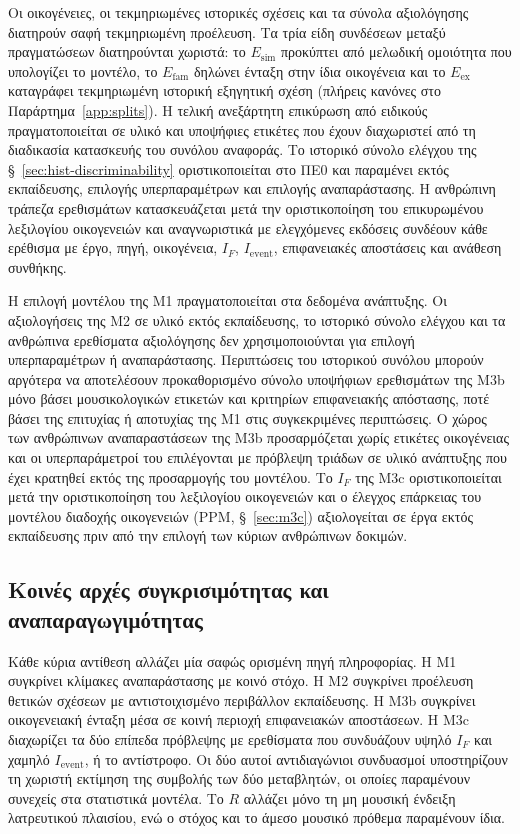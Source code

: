 \documentclass[11pt,a4paper]{article}
\begin{document}
Οι οικογένειες, οι τεκμηριωμένες ιστορικές σχέσεις και τα σύνολα αξιολόγησης διατηρούν σαφή τεκμηριωμένη προέλευση. Τα τρία είδη συνδέσεων μεταξύ πραγματώσεων διατηρούνται χωριστά: το $E_{\mathrm{sim}}$ προκύπτει από μελωδική ομοιότητα που υπολογίζει το μοντέλο, το $E_{\mathrm{fam}}$ δηλώνει ένταξη στην ίδια οικογένεια και το $E_{\mathrm{ex}}$ καταγράφει τεκμηριωμένη ιστορική εξηγητική σχέση (πλήρεις κανόνες στο Παράρτημα~\ref{app:splits}). Η τελική ανεξάρτητη επικύρωση από ειδικούς πραγματοποιείται σε υλικό και υποψήφιες ετικέτες που έχουν διαχωριστεί από τη διαδικασία κατασκευής του συνόλου αναφοράς. Το ιστορικό σύνολο ελέγχου της §~\ref{sec:hist-discriminability} οριστικοποιείται στο ΠΕ0 και παραμένει εκτός εκπαίδευσης, επιλογής υπερπαραμέτρων και επιλογής αναπαράστασης. Η ανθρώπινη τράπεζα ερεθισμάτων κατασκευάζεται μετά την οριστικοποίηση του επικυρωμένου λεξιλογίου οικογενειών και αναγνωριστικά με ελεγχόμενες εκδόσεις συνδέουν κάθε ερέθισμα με έργο, πηγή, οικογένεια, $I_F$, $I_{\mathrm{event}}$, επιφανειακές αποστάσεις και ανάθεση συνθήκης.

Η επιλογή μοντέλου της M1 πραγματοποιείται στα δεδομένα ανάπτυξης. Οι αξιολογήσεις της M2 σε υλικό εκτός εκπαίδευσης, το ιστορικό σύνολο ελέγχου και τα ανθρώπινα ερεθίσματα αξιολόγησης δεν χρησιμοποιούνται για επιλογή υπερπαραμέτρων ή αναπαράστασης. Περιπτώσεις του ιστορικού συνόλου μπορούν αργότερα να αποτελέσουν προκαθορισμένο σύνολο υποψήφιων ερεθισμάτων της M3b μόνο βάσει μουσικολογικών ετικετών και κριτηρίων επιφανειακής απόστασης, ποτέ βάσει της επιτυχίας ή αποτυχίας της M1 στις συγκεκριμένες περιπτώσεις. Ο χώρος των ανθρώπινων αναπαραστάσεων της M3b προσαρμόζεται χωρίς ετικέτες οικογένειας και οι υπερπαράμετροί του επιλέγονται με πρόβλεψη τριάδων σε υλικό ανάπτυξης που έχει κρατηθεί εκτός της προσαρμογής του μοντέλου. Το $I_F$ της M3c οριστικοποιείται μετά την οριστικοποίηση του λεξιλογίου οικογενειών και ο έλεγχος επάρκειας του μοντέλου διαδοχής οικογενειών (PPM, §~\ref{sec:m3c}) αξιολογείται σε έργα εκτός εκπαίδευσης πριν από την επιλογή των κύριων ανθρώπινων δοκιμών.

\subsection{Κοινές αρχές συγκρισιμότητας και αναπαραγωγιμότητας}

Κάθε κύρια αντίθεση αλλάζει μία σαφώς ορισμένη πηγή πληροφορίας. Η M1 συγκρίνει κλίμακες αναπαράστασης με κοινό στόχο. Η M2 συγκρίνει προέλευση θετικών σχέσεων με αντιστοιχισμένο περιβάλλον εκπαίδευσης. Η M3b συγκρίνει οικογενειακή ένταξη μέσα σε κοινή περιοχή επιφανειακών αποστάσεων. Η M3c διαχωρίζει τα δύο επίπεδα πρόβλεψης με ερεθίσματα που συνδυάζουν υψηλό $I_F$ και χαμηλό $I_{\mathrm{event}}$, ή το αντίστροφο. Οι δύο αυτοί αντιδιαγώνιοι συνδυασμοί υποστηρίζουν τη χωριστή εκτίμηση της συμβολής των δύο μεταβλητών, οι οποίες παραμένουν συνεχείς στα στατιστικά μοντέλα. Το $R$ αλλάζει μόνο τη μη μουσική ένδειξη λατρευτικού πλαισίου, ενώ ο στόχος και το άμεσο μουσικό πρόθεμα παραμένουν ίδια.
\end{document}
